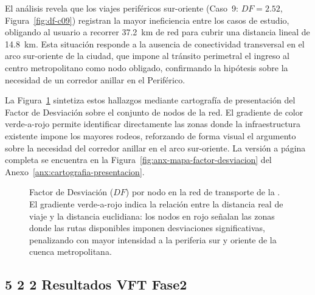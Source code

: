 El análisis revela que los viajes periféricos sur-oriente (Caso~9: $DF = 2.52$,
Figura~\ref{fig:df-c09}) registran la mayor ineficiencia entre los casos de
estudio, obligando al usuario a recorrer 37.2~km de red para cubrir una distancia
lineal de 14.8~km. Esta situación responde a la ausencia de conectividad
transversal en el arco sur-oriente de la ciudad, que impone al tránsito
perimetral el ingreso al centro metropolitano como nodo obligado, confirmando la
hipótesis sobre la necesidad de un corredor anillar en el Periférico.

La Figura~\ref{fig:mapa-df-presentacion} sintetiza estos hallazgos mediante
cartografía de presentación del Factor de Desviación sobre el conjunto de nodos
de la red. El gradiente de color verde-a-rojo permite identificar directamente las
zonas donde la infraestructura existente impone los mayores rodeos, reforzando de
forma visual el argumento sobre la necesidad del corredor anillar en el arco
sur-oriente. La versión a página completa se encuentra en la
Figura~\ref{fig:anx-mapa-factor-desviacion} del
Anexo~\ref{anx:cartografia-presentacion}.

\begin{figure}[H]
    \centering
    \caption[Cartografía de presentación — Factor de Desviación por nodo]{
    Factor de Desviación ($DF$) por nodo en la red de transporte de la \zmvm{}.
    El gradiente verde-a-rojo indica la relación entre la distancia real de viaje
    y la distancia euclidiana: los nodos en rojo señalan las zonas donde las
    rutas disponibles imponen desviaciones significativas, penalizando con mayor
    intensidad a la periferia sur y oriente de la cuenca metropolitana.}
    \label{fig:mapa-df-presentacion}
\end{figure}

\subsection*{5 2 2 Resultados VFT Fase2}
\section{}
\label{sec:resultados-fase2}

